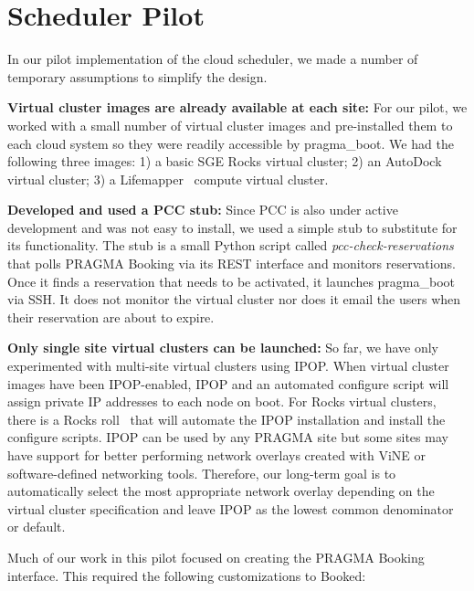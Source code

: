 \documentclass[times]{cpeauth}
\begin{document}
\section{Scheduler Pilot}
\label{Sec:Pilot}

In our pilot implementation of the cloud scheduler, we made a number of temporary assumptions to simplify the design.

\textbf{Virtual cluster images are already available at each site:}  For our pilot, we worked with a small number of virtual cluster images and pre-installed them to each cloud system so they were readily accessible by pragma\_boot.  We had the following three images: 1) a basic SGE Rocks virtual cluster; 2) an AutoDock virtual cluster;  3) a Lifemapper~\cite{lifemapper} compute virtual cluster.   

\textbf{Developed and used a PCC stub:}  Since PCC is also under active development and was not easy to install, we used a simple stub to substitute for its functionality.  The stub is a small Python script called \textit{pcc-check-reservations} that polls PRAGMA Booking via its REST interface and monitors reservations.  Once it finds a reservation that needs to be activated, it launches pragma\_boot via SSH.  It does not  monitor the virtual cluster nor does it email the users when their reservation are about to expire.  

\textbf{Only single site virtual clusters can be launched:}  So far, we have only experimented with multi-site virtual clusters using IPOP.  When virtual cluster images have been IPOP-enabled, IPOP and an automated configure script will assign private IP addresses to each node on boot.  For Rocks virtual clusters, there is a Rocks roll~\cite{ipoproll} that will automate the IPOP installation and install the configure scripts.  IPOP can be used by any PRAGMA site but some sites may have support for better performing network overlays created with ViNE or software-defined networking tools.  Therefore, our long-term goal is to automatically select the most appropriate network overlay depending on the virtual cluster specification and leave IPOP as the lowest common denominator or default.

Much of our work in this pilot focused on creating the PRAGMA Booking interface.  This required the following customizations to Booked:
\end{document}
